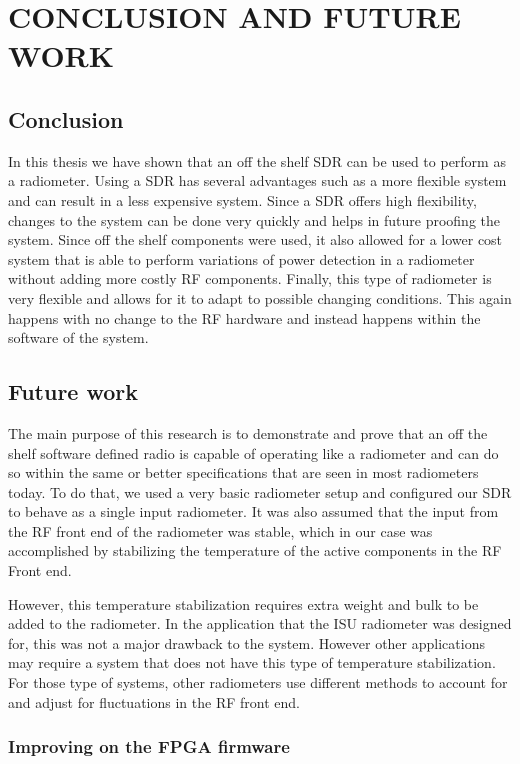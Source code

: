 \chapter{CONCLUSION AND FUTURE WORK} 

\section{Conclusion}
In this thesis we have shown that an off the shelf SDR can be used to perform as a radiometer.  Using a SDR has several advantages such as a more flexible system and can result in a less expensive system.  Since a SDR offers high flexibility, changes to the system can be done very quickly and helps in future proofing the system.  Since off the shelf components were used, it also allowed for a lower cost system that is able to perform variations of power detection in a radiometer without adding more costly RF components.  Finally, this type of radiometer is very flexible and allows for it to adapt to possible changing conditions.  This again happens with no change to the RF hardware and instead happens within the software of the system.

\section{Future work}
The main purpose of this research is to demonstrate and prove that an off the shelf software defined radio is capable of operating like a radiometer and can do so within the same or better specifications that are seen in most radiometers today.  To do that, we used a very basic radiometer setup and configured our SDR to behave as a single input radiometer.  It was also assumed that the input from the RF front end of the radiometer was stable, which in our case was accomplished by stabilizing the temperature of the active components in the RF Front end.

However, this temperature stabilization requires extra weight and bulk to be added to the radiometer.  In the application that the ISU radiometer was designed for, this was not a major drawback to the system.  However other applications may require a system that does not have this type of temperature stabilization.  For those type of systems, other radiometers use different methods to account for and adjust for fluctuations in the RF front end. 

\subsection{Improving on the FPGA firmware}

